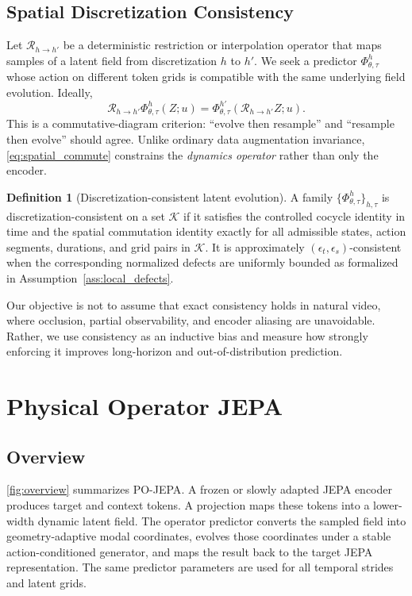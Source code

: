 \documentclass{article}
\theoremstyle{plain}
\theoremstyle{definition}
\newtheorem{definition}[theorem]{Definition}
\theoremstyle{remark}
\newcommand{\PhiOp}{\Phi}
\newcommand{\Restr}{\mathcal{R}}
\newcommand{\POJEPA}{\textsc{PO-JEPA}}
\begin{document}
\subsection{Spatial Discretization Consistency}
Let $\Restr_{h\rightarrow h'}$ be a deterministic restriction or interpolation operator that maps samples of a latent field from discretization $h$ to $h'$. We seek a predictor $\PhiOp_{\theta,\tau}^{h}$ whose action on different token grids is compatible with the same underlying field evolution. Ideally,
\begin{equation}
    \Restr_{h\rightarrow h'}
    \PhiOp_{\theta,\tau}^{h}(Z;u)
    =
    \PhiOp_{\theta,\tau}^{h'}
    (\Restr_{h\rightarrow h'}Z;u).
    \label{eq:spatial_commute}
\end{equation}
This is a commutative-diagram criterion: ``evolve then resample'' and ``resample then evolve'' should agree. Unlike ordinary data augmentation invariance, \cref{eq:spatial_commute} constrains the \emph{dynamics operator} rather than only the encoder.

\begin{definition}[Discretization-consistent latent evolution]
A family $\{\PhiOp^{h}_{\theta,\tau}\}_{h,\tau}$ is discretization-consistent on a set $\mathcal{K}$ if it satisfies the controlled cocycle identity in time and the spatial commutation identity exactly for all admissible states, action segments, durations, and grid pairs in $\mathcal{K}$. It is approximately $(\epsilon_t,\epsilon_s)$-consistent when the corresponding normalized defects are uniformly bounded as formalized in Assumption~\ref{ass:local_defects}.
\end{definition}

Our objective is not to assume that exact consistency holds in natural video, where occlusion, partial observability, and encoder aliasing are unavoidable. Rather, we use consistency as an inductive bias and measure how strongly enforcing it improves long-horizon and out-of-distribution prediction.

\section{Physical Operator JEPA}

\subsection{Overview}
\cref{fig:overview} summarizes \POJEPA{}. A frozen or slowly adapted JEPA encoder produces target and context tokens. A projection maps these tokens into a lower-width dynamic latent field. The operator predictor converts the sampled field into geometry-adaptive modal coordinates, evolves those coordinates under a stable action-conditioned generator, and maps the result back to the target JEPA representation. The same predictor parameters are used for all temporal strides and latent grids.
\end{document}
